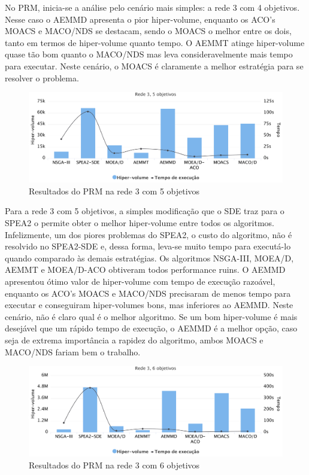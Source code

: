 No PRM, inicia-se a análise pelo cenário mais simples: a rede 3 com 4 objetivos. Nesse caso o AEMMD apresenta o pior hiper-volume, enquanto os ACO's MOACS e MACO/NDS se destacam, sendo o MOACS o melhor entre os dois, tanto em termos de hiper-volume quanto tempo. O AEMMT atinge hiper-volume quase tão bom quanto o MACO/NDS mas leva consideravelmente mais tempo para executar. Neste cenário, o MOACS é claramente a melhor estratégia para se resolver o problema.

\begin{figure}[!htbp]
	\caption{Resultados do PRM na rede 3 com 5 objetivos}
	\label{fig_exp4_r3o5}
	\includegraphics[width=1\textwidth]{cap_experimentos/figs/etapa4/r3o5}
\end{figure}

Para a rede 3 com 5 objetivos, a simples modificação que o SDE traz para o SPEA2 o permite obter o melhor hiper-volume entre todos os algoritmos. Infelizmente, um dos piores problemas do SPEA2, o custo do algoritmo, não é resolvido no SPEA2-SDE e, dessa forma, leva-se muito tempo para executá-lo quando comparado às demais estratégias. Os algoritmos NSGA-III, MOEA/D, AEMMT e MOEA/D-ACO obtiveram todos performance ruins. O AEMMD apresentou ótimo valor de hiper-volume com tempo de execução razoável, enquanto os ACO's MOACS e MACO/NDS precisaram de menos tempo para executar e conseguiram hiper-volumes bons, mas inferiores ao AEMMD. Neste cenário, não é claro qual é o melhor algoritmo. Se um bom hiper-volume é mais desejável que um rápido tempo de execução, o AEMMD é a melhor opção, caso seja de extrema importância a rapidez do algoritmo, ambos MOACS e MACO/NDS fariam bem o trabalho.

\begin{figure}[!htbp]
	\caption{Resultados do PRM na rede 3 com 6 objetivos}
	\label{fig_exp4_r3o6}
	\includegraphics[width=1\textwidth]{cap_experimentos/figs/etapa4/r3o6}
\end{figure}


